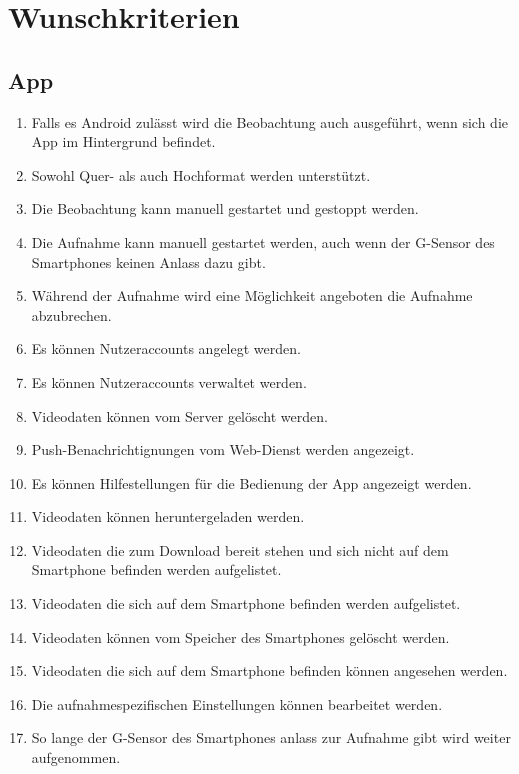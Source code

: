 \section{Wunschkriterien}
\subsection{App}
	\begin{enumerate}
	\renewcommand{\labelenumi}{\textbf{\theenumi}}
	\renewcommand{\theenumi}{WK\arabic{enumi}0}
	\setcounter{enumi}{99}
	\item Falls es \gls{Android} zulässt wird die Beobachtung auch ausgeführt, wenn sich die \gls{App} im Hintergrund befindet.
	\item Sowohl Quer- als auch Hochformat werden unterstützt.
	\item Die Beobachtung kann manuell gestartet und gestoppt werden.
	\item Die Aufnahme kann manuell gestartet werden, auch wenn der \gls{G-Sensor} des Smartphones keinen Anlass dazu gibt.
	\item Während der Aufnahme wird eine Möglichkeit angeboten die Aufnahme abzubrechen.
	\item Es können Nutzeraccounts angelegt werden.
	\item Es können Nutzeraccounts verwaltet werden.
	\item {} Videodaten können vom Server gelöscht werden.
	\item Push-Benachrichtignungen vom \gls{Web-Dienst} werden angezeigt.
	\item Es können Hilfestellungen für die Bedienung der \gls{App} angezeigt werden.
	\item {} Videodaten können heruntergeladen werden.
	\item {} Videodaten die zum Download bereit stehen und sich nicht auf dem \gls{Smartphone} befinden werden aufgelistet.
	\item {} Videodaten die sich auf dem \gls{Smartphone} befinden  werden aufgelistet.
	\item {} Videodaten können vom Speicher des \glspl{Smartphone} gelöscht werden.
	\item {} Videodaten die sich auf dem \gls{Smartphone} befinden können angesehen werden.
	\item Die aufnahmespezifischen Einstellungen können bearbeitet werden.
	\item So lange der \gls{G-Sensor} des Smartphones anlass zur Aufnahme gibt wird weiter aufgenommen.
	\end{enumerate}
